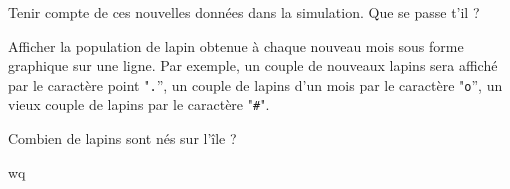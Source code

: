 \begin{lastenu}
  \item Tenir compte de ces nouvelles données dans la simulation. Que
    se passe t'il ?
\item Afficher la population de lapin obtenue à chaque nouveau mois
  sous forme graphique sur une ligne. Par exemple, un couple de
  nouveaux lapins sera affiché par le caractère point "\verb+.+'', un couple de lapins d'un
  mois par le caractère "\verb+o+'', un vieux couple de lapins par le
  caractère "\verb+#+".
\item Combien de lapins sont nés sur l'île ?
\end{lastenu}

\begin{correction}wq
  \begin{small}
    
    \end{small}
\end{correction}

